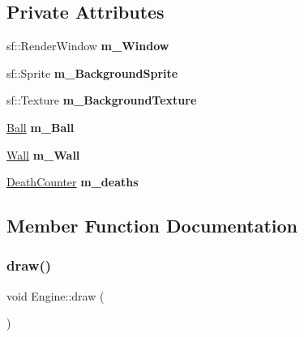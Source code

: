 \subsection*{Private Attributes}
\begin{DoxyCompactItemize}
\item 
\mbox{\label{class_engine_a756f5689a65c509b3c2ebcb33608ab5b}} 
sf\+::\+Render\+Window {\bfseries m\+\_\+\+Window}
\item 
\mbox{\label{class_engine_a0ef976fb9255fc03a630931e714b24ad}} 
sf\+::\+Sprite {\bfseries m\+\_\+\+Background\+Sprite}
\item 
\mbox{\label{class_engine_aabaf3134bc8298a762ee985c6d69be89}} 
sf\+::\+Texture {\bfseries m\+\_\+\+Background\+Texture}
\item 
\mbox{\label{class_engine_a73306620329675963a09fb555434fd94}} 
\mbox{\hyperlink{class_ball}{Ball}} {\bfseries m\+\_\+\+Ball}
\item 
\mbox{\label{class_engine_a2ce324eadc114feaa8e49f5000b7d964}} 
\mbox{\hyperlink{class_wall}{Wall}} {\bfseries m\+\_\+\+Wall}
\item 
\mbox{\label{class_engine_a5ef63951ddd6efea2c17760091e86752}} 
\mbox{\hyperlink{class_death_counter}{Death\+Counter}} {\bfseries m\+\_\+deaths}
\end{DoxyCompactItemize}


\subsection{Member Function Documentation}
\mbox{\label{class_engine_a1b654dc41dfbcb5072147f33142b726e}} 
\subsubsection{\texorpdfstring{draw()}{draw()}}
{\footnotesize\ttfamily void Engine\+::draw (\begin{DoxyParamCaption}{ }\end{DoxyParamCaption})\hspace{0.3cm}{\ttfamily [private]}}




